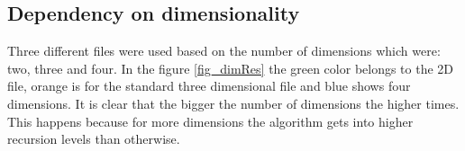 \subsection{Dependency on dimensionality}
Three different files were used based on the number of dimensions which were: two, three and four. In the figure \ref{fig_dimRes} the green color belongs to the 2D file, orange is for the standard three dimensional file and blue shows four dimensions. It is clear that the bigger the number of dimensions the higher times. This happens because for more dimensions the algorithm gets into higher recursion levels than otherwise.

\begin{figure}
\begin{minipage}{\linewidth}
\centering
{}
\end{minipage}\par\medskip

\begin{minipage}{.5\linewidth}
\centering
{}
\end{minipage}%
\begin{minipage}{.5\linewidth}
\centering
{}
\end{minipage}\par\medskip


\end{figure}
